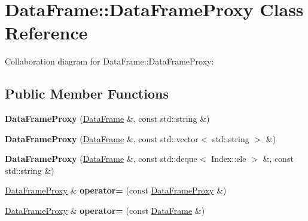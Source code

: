 \hypertarget{classDataFrame_1_1DataFrameProxy}{}\section{Data\+Frame\+:\+:Data\+Frame\+Proxy Class Reference}
\label{classDataFrame_1_1DataFrameProxy}


Collaboration diagram for Data\+Frame\+:\+:Data\+Frame\+Proxy\+:
\subsection*{Public Member Functions}
\begin{DoxyCompactItemize}
\item 
\mbox{\label{classDataFrame_1_1DataFrameProxy_ada735f045032e0f804c1158ca6786746}} 
{\bfseries Data\+Frame\+Proxy} (\hyperlink{classDataFrame}{Data\+Frame} \&, const std\+::string \&)
\item 
\mbox{\label{classDataFrame_1_1DataFrameProxy_ac7a390ace45f4ae0f4deaf0c7eedc90d}} 
{\bfseries Data\+Frame\+Proxy} (\hyperlink{classDataFrame}{Data\+Frame} \&, const std\+::vector$<$ std\+::string $>$ \&)
\item 
\mbox{\label{classDataFrame_1_1DataFrameProxy_afc389928d0b951d43ab6bcb775db799b}} 
{\bfseries Data\+Frame\+Proxy} (\hyperlink{classDataFrame}{Data\+Frame} \&, const std\+::deque$<$ Index\+::ele $>$ \&, const std\+::string \&)
\item 
\mbox{\label{classDataFrame_1_1DataFrameProxy_a6d56fc9161384065db7812e513313731}} 
\hyperlink{classDataFrame_1_1DataFrameProxy}{Data\+Frame\+Proxy} \& {\bfseries operator=} (const \hyperlink{classDataFrame_1_1DataFrameProxy}{Data\+Frame\+Proxy} \&)
\item 
\mbox{\label{classDataFrame_1_1DataFrameProxy_a680def6fdcc7d488e10b2dba471f8854}} 
\hyperlink{classDataFrame_1_1DataFrameProxy}{Data\+Frame\+Proxy} \& {\bfseries operator=} (const \hyperlink{classDataFrame}{Data\+Frame} \&)
\item 
\mbox{\label{classDataFrame_1_1DataFrameProxy_ae6c8c653d011966f9bf91396123bb0a5}} 

\end{DoxyCompactItemize}

